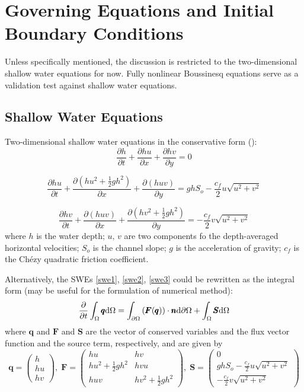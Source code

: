 \documentclass{jfm}
\newcommand{\pa}[2]{\frac{\partial#1}{\partial#2}}
\newcommand{\md}{{\rm{d}}}
\begin{document}
\section{Governing Equations and Initial Boundary Conditions}
Unless specifically mentioned, the discussion is restricted to the two-dimensional shallow water equations for now.  Fully nonlinear Boussinesq equations serve as a validation test against shallow water equations.
\subsection{Shallow Water Equations}
Two-dimensional shallow water equations in the conservative form (\cite{Toro2001}):
\begin{equation}
	\pa{h}{t}+\pa{hu}{x}+\pa{hv}{y}=0
	\label{swe1}
\end{equation}

\begin{equation}
	\pa{hu}{t}+\pa{(hu^2+\frac{1}{2}gh^2)}{x}+\pa{(huv)}{y}= ghS_o-\frac{c_f}{2}u\sqrt{u^2+v^2}
	\label{swe2}
\end{equation}

\begin{equation}
	\pa{hv}{t}+\pa{(huv)}{x}+\pa{(hv^2+\frac{1}{2}gh^2)}{y}= -\frac{c_f}{2}v\sqrt{u^2+v^2}
	\label{swe3}
\end{equation}
where $h$ is the water depth; $u,\,v$ are two components fo the depth-averaged horizontal velocities; $S_o$ is the channel slope; $g$ is the acceleration of gravity; $c_f$ is the Ch\'ezy quadratic friction coefficient.

Alternatively, the SWEs \autoref{swe1}, \autoref{swe2}, \autoref{swe3}  could be rewritten as the integral form (may be useful for the formulation of numerical method):
\begin{equation}
\pa{}{t}\int_{\Omega}\pmb{q}\md \Omega = \int_{\partial \Omega}\left (  \pmb{F}(\pmb{q}) \right ) \cdot \pmb{n} \md \partial \Omega+\int_{\Omega} \pmb{S}\md \Omega
\label{swe11}
\end{equation}
where $\pmb{q}$ and $\pmb{{F}}$ and $ \pmb{S}$ are  the vector of conserved variables and  the flux vector function and the source term, respectively, and are given by
\begin{equation}
{\pmb q} = \left( \begin{array}{c} h\\
	hu \\
	hv \end{array} \right) ,
 \; {\pmb{F}} =\begin{pmatrix}
	hu & hv \\
	hu^2+\frac{1}{2}gh^2 & hvu \\
	huv & hv^2+\frac{1}{2}gh^2
\end{pmatrix} ,
 \; \pmb{S} =  \left( \begin{array}{c}
	0 \\
	ghS_o-\frac{c_f}{2}u\sqrt{u^2+v^2} \\
	-\frac{c_f}{2}v\sqrt{u^2+v^2}
	\end{array}
\right)
\end{equation}
\end{document}
